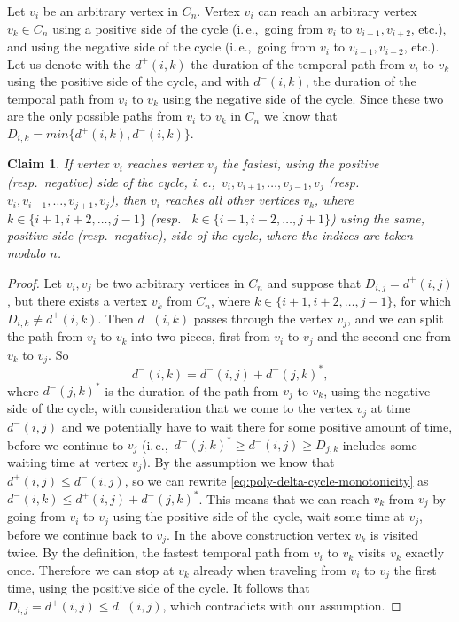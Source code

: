 \documentclass[11pt,a4paper]{article}
\newtheorem{claim}[theorem]{Claim}
\theoremstyle{remark}
\theoremstyle{definition}
\newcommand{\ie}{i.\,e.,\ }
\begin{document}
Let $v_i$ be an arbitrary vertex in $C_n$.
Vertex $v_i$ can reach an arbitrary vertex $v_k \in C_n$ using a positive side of the cycle (\ie going from $v_i$ to $v_{i+1},  v_{i+2}$, etc.), 
and using the negative side of the cycle (\ie going from $v_i$ to $v_{i-1}, v_{i-2}$, etc.).
Let us denote with the $d^+(i,k)$ the duration of the temporal path from $v_i$ to $v_k$ using the positive side of the cycle,
and with $d^-(i,k)$, the duration of the temporal path from $v_i$ to $v_k$ using the negative side of the cycle.
Since these two are the only possible paths from $v_i$ to $v_k$ in $C_n$ we know that $D_{i,k} = min \{d^+(i,k), d^-(i,k)\}$.

\begin{claim} \label{claim:poly-delta-cycle-monotonicity}
    If vertex $v_i$ reaches vertex $v_j$ the fastest, using the positive (resp.~negative) side of the cycle, \ie $v_i, v_{i+1}, \dots, v_{j-1}, v_j$ (resp. $v_i, v_{i-1}, \dots, v_{j+1}, v_j$),
    then $v_i$ reaches all other vertices $v_k$, where $k \in \{i+1, i+2, \dots, j-1\}$ (resp.~ $k \in \{i-1, i-2, \dots, j+1\}$)
    using the same, positive side  (resp.~negative), side of the cycle,
    where the indices are taken modulo $n$.
\end{claim}
\begin{proof}
    Let $v_i, v_j$ be two arbitrary vertices in $C_n$ and suppose that $D_{i,j} = d^+(i,j)$,
    but there exists a vertex $v_k$ from $C_n$, where $k \in \{i+1, i+2, \dots, j-1\}$,
    for which $D_{i,k} \neq d^+(i,k)$.
    Then $d^-(i,k)$ passes through the vertex $v_j$, and we can split the path from $v_i$ to $v_k$ into two pieces, 
    first from $v_i$ to $v_j$ and the second one from $v_k$ to $v_j$.
    So 
    \begin{equation} \label{eq:poly-delta-cycle-monotonicity}
        d^-(i,k) = d^-(i,j) + d^-(j,k)^*,
    \end{equation} where $d^-(j,k)^*$ is the duration of the path from $v_j$ to $v_k$, using the negative side of the cycle, with consideration that we come to the vertex $v_j$ at time $d^-(i,j)$ and we potentially have to wait there for some positive amount of time, before we continue to $v_j$
    (\ie $d^-(j,k)^* \geq d^-(i,j) \geq D_{j,k}$ includes some waiting time at vertex $v_j$).
    By the assumption we know that $d^+(i,j) \leq d^-(i,j)$, so we can rewrite \cref{eq:poly-delta-cycle-monotonicity} as
    $d^-(i,k) \leq d^+(i,j) + d^-(j,k)^*$. This means that we can reach $v_k$ from $v_j$ by going from $v_i$ to $v_j$ using the positive side of the cycle, wait some time at $v_j$, before we continue back to $v_j$.
    In the above construction vertex $v_k$ is visited twice. By the definition, the fastest temporal path from $v_i$ to $v_k$ visits $v_k$ exactly once. Therefore we can stop at $v_k$ already when traveling from $v_i$ to $v_j$ the first time, using the positive side of the cycle.
    It follows that $D_{i,j} = d^+(i,j) \leq d^-(i,j)$, which contradicts with our assumption.
\end{proof}
\end{document}
